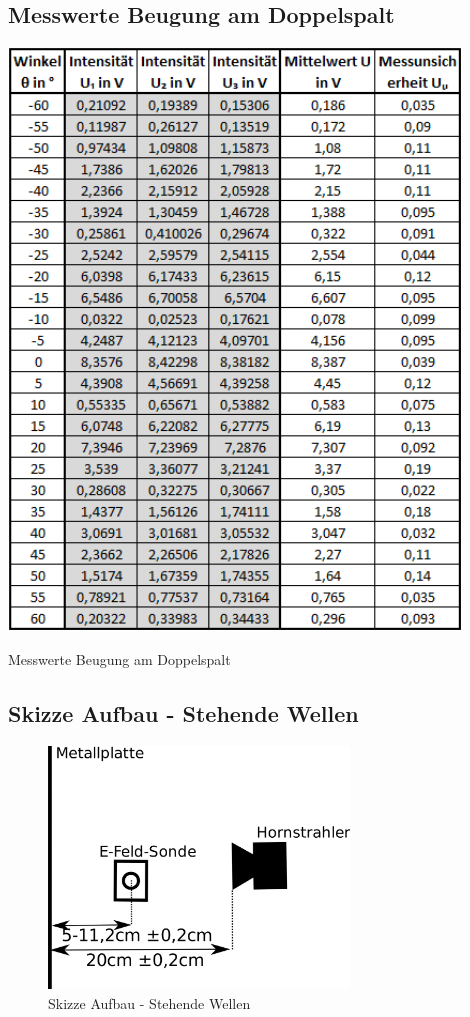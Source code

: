 \documentclass[a4paper]{scrartcl}
\numberwithin{equation}{subsection}
\begin{document}
\subsection{Messwerte Beugung am Doppelspalt}
\label{sec:MesswerteDoppelspalt}
\begin{table}[H]
\includegraphics[width=12cm]{Messwerte_Doppelspalt}
\centering
\caption{Messwerte Beugung am Doppelspalt}
\label{tab:MesswerteDoppelspalt}
\end{table}
\subsection{Skizze Aufbau - Stehende Wellen}

\label{sec:SkizzeStehendeWellen}

\begin{figure}[H]
\includegraphics[width=8cm]{Zeichnung_Wellen}
\centering
\caption{Skizze Aufbau - Stehende Wellen}
\centering
\label{fig:SkizzeStehendeWellen}
\end{figure}
\end{document}
